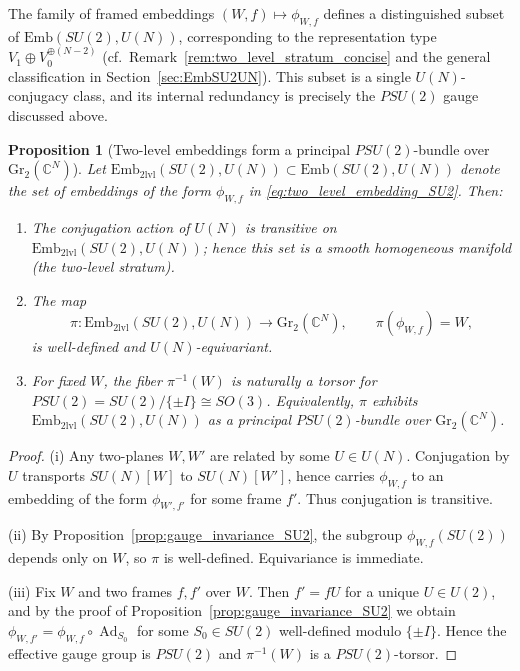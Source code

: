 \documentclass{article}%
\newtheorem{proposition}[theorem]{Proposition}
\theoremstyle{definition}
\numberwithin{equation}{section}
\newcommand{\C}{\mathbb{C}}
\newcommand{\Gr}{\mathrm{Gr}}
\newcommand{\Emb}{\mathrm{Emb}}
\DeclareMathOperator{\Ad}{Ad}
\begin{document}
The family of framed embeddings $(W,f)\mapsto \phi_{W,f}$ defines a distinguished subset of
$\Emb(SU(2),U(N))$, corresponding to the representation type
$V_{1}\oplus V_{0}^{\oplus(N-2)}$ (cf.\ Remark~\ref{rem:two_level_stratum_concise} and the general
classification in Section~\ref{sec:EmbSU2UN}). This subset is a single $U(N)$-conjugacy class, and
its internal redundancy is precisely the $PSU(2)$ gauge discussed above.

\begin{proposition}[Two-level embeddings form a principal $PSU(2)$-bundle over $\Gr_2(\C^N)$]
\label{prop:two_level_principal_bundle_SU2}
Let $\Emb_{\mathrm{2lvl}}(SU(2),U(N))\subset \Emb(SU(2),U(N))$ denote the set of embeddings of the form
$\phi_{W,f}$ in \eqref{eq:two_level_embedding_SU2}. Then:
\begin{enumerate}
\item[(i)] The conjugation action of $U(N)$ is transitive on $\Emb_{\mathrm{2lvl}}(SU(2),U(N))$; hence
this set is a smooth homogeneous manifold (the \emph{two-level stratum}).
\item[(ii)] The map
\[
\pi:\Emb_{\mathrm{2lvl}}(SU(2),U(N))\to \Gr_2(\C^N),\qquad \pi(\phi_{W,f})=W,
\]
is well-defined and $U(N)$-equivariant.
\item[(iii)] For fixed $W$, the fiber $\pi^{-1}(W)$ is naturally a torsor for
$PSU(2)=SU(2)/\{\pm I\}\cong SO(3)$. Equivalently, $\pi$ exhibits
$\Emb_{\mathrm{2lvl}}(SU(2),U(N))$ as a principal $PSU(2)$-bundle over $\Gr_2(\C^N)$.
\end{enumerate}
\end{proposition}

\begin{proof}
(i) Any two-planes $W,W'$ are related by some $U\in U(N)$. Conjugation by $U$ transports $SU(N)[W]$ to
$SU(N)[W']$, hence carries $\phi_{W,f}$ to an embedding of the form $\phi_{W',f'}$ for some frame
$f'$. Thus conjugation is transitive.

(ii) By Proposition~\ref{prop:gauge_invariance_SU2}, the subgroup $\phi_{W,f}(SU(2))$ depends only on
$W$, so $\pi$ is well-defined. Equivariance is immediate.

(iii) Fix $W$ and two frames $f,f'$ over $W$. Then $f'=fU$ for a unique $U\in U(2)$, and by the proof
of Proposition~\ref{prop:gauge_invariance_SU2} we obtain
$\phi_{W,f'}=\phi_{W,f}\circ \Ad_{S_0}$ for some $S_0\in SU(2)$ well-defined modulo $\{\pm I\}$.
Hence the effective gauge group is $PSU(2)$ and $\pi^{-1}(W)$ is a $PSU(2)$-torsor.
\end{proof}
\end{document}
